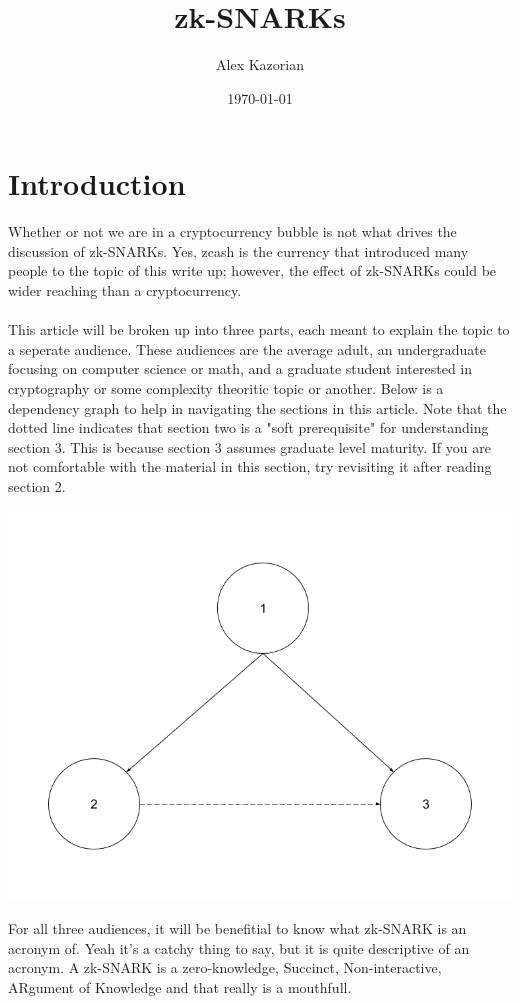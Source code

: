 \documentclass{article}
\title{zk-SNARKs}
\author{Alex Kazorian}
\date{\today}
\begin{document}
\maketitle
\section*{Introduction}
Whether or not we are in a cryptocurrency bubble is not what drives the discussion of zk-SNARKs. Yes, zcash is the currency that introduced many people to the topic of this write up; however, the effect of zk-SNARKs could be wider reaching than a cryptocurrency. \\ \\
\noindent This article will be broken up into three parts, each meant to explain the topic to a seperate audience. These audiences are the average adult, an undergraduate focusing on computer science or math, and a graduate student interested in cryptography or some complexity theoritic topic or another. Below is a dependency graph to help in navigating the sections in this article. Note that the dotted line indicates that section two is a "soft prerequisite" for understanding section 3. This is because section 3 assumes graduate level maturity. If you are not comfortable with the material in this section, try revisiting it after reading section 2.
\begin{center}
\includegraphics[scale=0.4]{zk-SNARK_fig1}
\end{center}
For all three audiences, it will be benefitial to know what zk-SNARK is an acronym of. Yeah it's a catchy thing to say, but it is quite descriptive of an acronym. A zk-SNARK is a zero-knowledge, Succinct, Non-interactive, ARgument of Knowledge and that really is a mouthfull.
\end{document}
